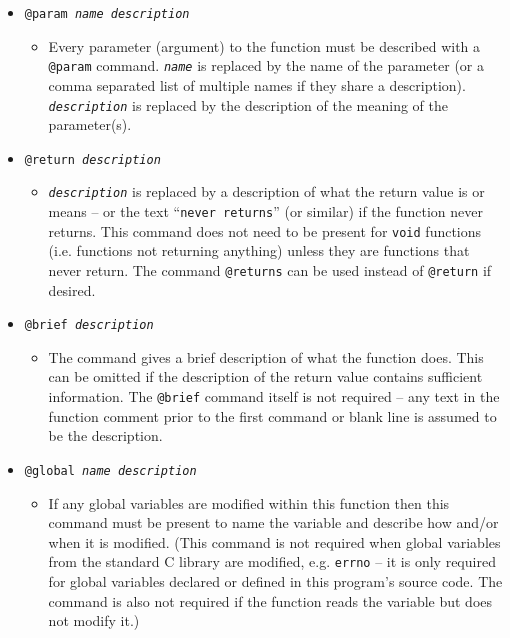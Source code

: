 \documentclass{article}
\begin{document}
\pagebreak\begin{itemize}[label={}]
\item \texttt{@param \textit{name} \textit{description}}
    \begin{itemize}[label={}]
    \item Every parameter (argument) to the function must be described with a \texttt{@param} command. \texttt{\textit{name}} is replaced by the name of the parameter (or a comma separated list of multiple names if they share a description). \texttt{\textit{description}} is replaced by the description of the meaning of the parameter(s).
    \end{itemize}
    
\item \texttt{@return \textit{description}}
    \begin{itemize}[label={}]
    \item \texttt{\textit{description}} is replaced by a description of what the return value is or means -- or the text ``\texttt{never returns}'' (or similar) if the function never returns. This command does not need to be present for \texttt{void} functions (i.e. functions not returning anything) unless they are functions that never return. The command \texttt{@returns} can be used instead of \texttt{@return} if desired.
    \end{itemize}
    
\item \texttt{@brief \textit{description}}
    \begin{itemize}[label={}]
    \item The command gives a brief description of what the function does. This can be omitted if the description of the return value contains sufficient information. The \texttt{@brief} command itself is not required -- any text in the function comment prior to the first command or blank line is assumed to be the  description.
    \end{itemize}

\item \texttt{@global \textit{name} \textit{description}}
    \begin{itemize}[label={}]
    \item If any global variables are modified within this function then this command must be present to name the variable and describe how and/or when it is modified. (This command is not required when global variables from the standard C library are modified, e.g. \texttt{errno} -- it is only required for global variables declared or defined in this program's source code. The command is also not required if the function reads the variable but does not modify it.)
    \end{itemize}
    

\end{itemize}
\end{document}
